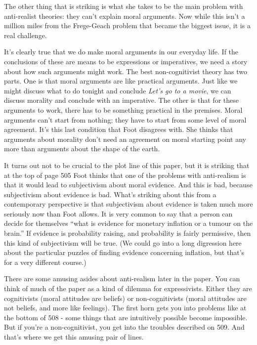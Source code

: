 \documentclass[
]{article}
\begin{document}
The other thing that is striking is what she takes to be the main
problem with anti-realist theories: they can't explain moral arguments.
Now while this isn't a million miles from the Frege-Geach problem that
became the biggest issue, it is a real challenge.

It's clearly true that we do make moral arguments in our everyday life.
If the conclusions of these are means to be expressions or imperatives,
we need a story about how such arguments might work. The best
non-cognitivist theory has two parts. One is that moral arguments are
like practical arguments. Just like we might discuss what to do tonight
and conclude \emph{Let's go to a movie}, we can discuss morality and
conclude with an imperative. The other is that for these arguments to
work, there has to be something practical in the premises. Moral
arguments can't start from nothing; they have to start from some level
of moral agreement. It's this last condition that Foot disagrees with.
She thinks that arguments about morality don't need an agreement on
moral starting point any more than arguments about the shape of the
earth.

It turns out not to be crucial to the plot line of this paper, but it is
striking that at the top of page 505 Foot thinks that one of the
problems with anti-realism is that it would lead to subjectivism about
moral evidence. And this is bad, because subjectivism about evidence is
bad. What's striking about this from a contemporary perspective is that
subjectivism about evidence is taken much more seriously now than Foot
allows. It is very common to say that a person can decide for themselves
``what is evidence for monetary inflation or a tumour on the brain.'' If
evidence is probability raising, and probability is fairly permissive,
then this kind of subjectivism will be true. (We could go into a long
digression here about the particular puzzles of finding evidence
concerning inflation, but that's for a very different course.)

There are some amusing asides about anti-realism later in the paper. You
can think of much of the paper as a kind of dilemma for expressivists.
Either they are cognitivists (moral attitudes are beliefs) or
non-cognitivists (moral attitudes are not beliefs, and more like
feelings). The first horn gets you into problems like at the bottom of
508 - some things that are intuitively possible become impossible. But
if you're a non-cognitivist, you get into the troubles described on 509.
And that's where we get this amusing pair of lines.
\end{document}
